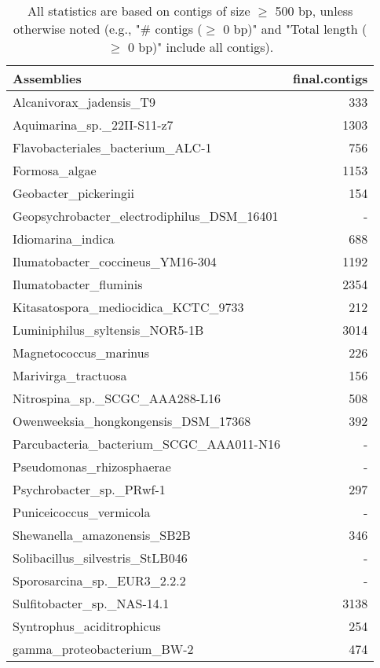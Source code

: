 \documentclass[12pt,a4paper]{article}
\begin{document}
\begin{table}[ht]
\begin{center}
\caption{All statistics are based on contigs of size $\geq$ 500 bp, unless otherwise noted (e.g., "\# contigs ($\geq$ 0 bp)" and "Total length ($\geq$ 0 bp)" include all contigs).}
\begin{tabular}{|l*{1}{|r}|}
\hline
Assemblies & final.contigs \\ \hline
Alcanivorax\_jadensis\_T9 & 333 \\ \hline
Aquimarina\_sp.\_22II-S11-z7 & 1303 \\ \hline
Flavobacteriales\_bacterium\_ALC-1 & 756 \\ \hline
Formosa\_algae & 1153 \\ \hline
Geobacter\_pickeringii & 154 \\ \hline
Geopsychrobacter\_electrodiphilus\_DSM\_16401 & - \\ \hline
Idiomarina\_indica & 688 \\ \hline
Ilumatobacter\_coccineus\_YM16-304 & 1192 \\ \hline
Ilumatobacter\_fluminis & 2354 \\ \hline
Kitasatospora\_mediocidica\_KCTC\_9733 & 212 \\ \hline
Luminiphilus\_syltensis\_NOR5-1B & 3014 \\ \hline
Magnetococcus\_marinus & 226 \\ \hline
Marivirga\_tractuosa & 156 \\ \hline
Nitrospina\_sp.\_SCGC\_AAA288-L16 & 508 \\ \hline
Owenweeksia\_hongkongensis\_DSM\_17368 & 392 \\ \hline
Parcubacteria\_bacterium\_SCGC\_AAA011-N16 & - \\ \hline
Pseudomonas\_rhizosphaerae & - \\ \hline
Psychrobacter\_sp.\_PRwf-1 & 297 \\ \hline
Puniceicoccus\_vermicola & - \\ \hline
Shewanella\_amazonensis\_SB2B & 346 \\ \hline
Solibacillus\_silvestris\_StLB046 & - \\ \hline
Sporosarcina\_sp.\_EUR3\_2.2.2 & - \\ \hline
Sulfitobacter\_sp.\_NAS-14.1 & 3138 \\ \hline
Syntrophus\_aciditrophicus & 254 \\ \hline
gamma\_proteobacterium\_BW-2 & 474 \\ \hline
\end{tabular}
\end{center}
\end{table}
\end{document}
